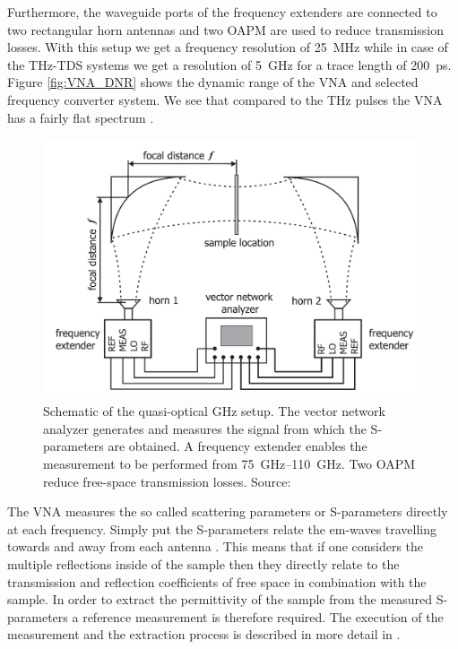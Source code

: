 Furthermore, the waveguide ports of the frequency extenders are connected to two rectangular horn antennas and two OAPM are used to reduce transmission losses. With this setup we get a frequency resolution of \SI{25}{\mega \hertz} while in case of the THz-TDS systems we get a resolution of \SI{5}{\giga \hertz} for a trace length of \SI{200}{\pico \second}. Figure \ref{fig:VNA_DNR} shows the dynamic range of the VNA and selected frequency converter system. We see that compared to the THz pulses the VNA has a fairly flat spectrum \cite{VNADNR2013, Kazemipour2015}.

\begin{figure}[H]
    \centering
    \includegraphics[scale=0.4]{images/3_chapter03/ghz.png}
    \caption{Schematic of the quasi-optical GHz setup. The vector network analyzer generates and measures the signal from which the S-parameters are obtained. A frequency extender enables the measurement to be performed from \SIrange{75}{110}{\giga \hertz}. Two OAPM reduce free-space transmission losses. Source: \cite{Kazemipour2015}}
    \label{fig:GHz_setup}
\end{figure}

The VNA measures the so called scattering parameters or S-parameters directly at each frequency. Simply put the S-parameters relate the em-waves travelling towards and away from each antenna \cite{Caspers2012}. This means that if one considers the multiple reflections inside of the sample then they directly relate to the transmission and reflection coefficients of free space in combination with the sample. In order to extract the permittivity of the sample from the measured S-parameters a reference measurement is therefore required. The execution of the measurement and the extraction process is described in more detail in \cite{Kazemipour2015}. 


